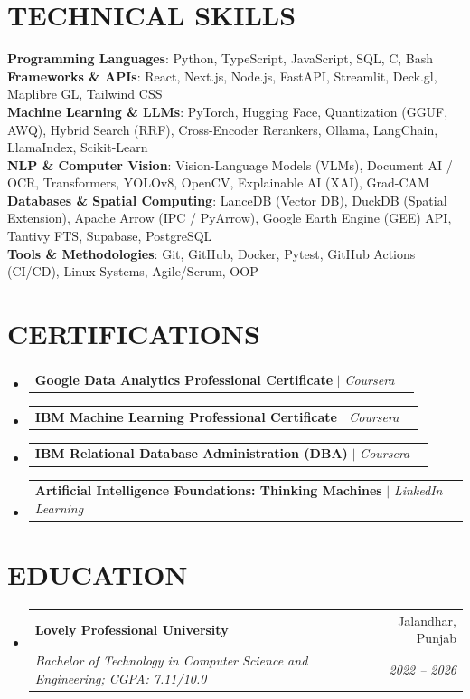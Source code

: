 \documentclass[letterpaper,10pt]{article}
\makeatletter
\newcommand{\resumeSubheading}[4]{
  \vspace{-2pt}\item
    \begin{tabular*}{0.97\textwidth}[t]{l@{\extracolsep{\fill}}r}
      \textbf{#1} & #2 \\
      \textit{\small#3} & \textit{\small #4} \\
    \end{tabular*}\vspace{-7pt}
}
\newcommand{\resumeProjectHeading}[2]{
    \item
    \begin{tabular*}{0.97\textwidth}{l@{\extracolsep{\fill}}r}
      \small#1 & #2 \\
    \end{tabular*}\vspace{-7pt}
}
\newcommand{\resumeSubHeadingListStart}{\begin{itemize}[leftmargin=0.15in, label={}]}
\newcommand{\resumeSubHeadingListEnd}{\end{itemize}}
\makeatother
\begin{document}
\section{TECHNICAL SKILLS}
 \begin{itemize}[leftmargin=0.15in, label={}]
    \small{\item{
      \textbf{Programming Languages}{: Python, TypeScript, JavaScript, SQL, C, Bash} \\
      \textbf{Frameworks \& APIs}{: React, Next.js, Node.js, FastAPI, Streamlit, Deck.gl, Maplibre GL, Tailwind CSS} \\
      \textbf{Machine Learning \& LLMs}{: PyTorch, Hugging Face, Quantization (GGUF, AWQ), Hybrid Search (RRF), Cross-Encoder Rerankers, Ollama, LangChain, LlamaIndex, Scikit-Learn} \\
      \textbf{NLP \& Computer Vision}{: Vision-Language Models (VLMs), Document AI / OCR, Transformers, YOLOv8, OpenCV, Explainable AI (XAI), Grad-CAM} \\
      \textbf{Databases \& Spatial Computing}{: LanceDB (Vector DB), DuckDB (Spatial Extension), Apache Arrow (IPC / PyArrow), Google Earth Engine (GEE) API, Tantivy FTS, Supabase, PostgreSQL} \\
      \textbf{Tools \& Methodologies}{: Git, GitHub, Docker, Pytest, GitHub Actions (CI/CD), Linux Systems, Agile/Scrum, OOP}
    }}
 \end{itemize}

\section{CERTIFICATIONS}
    \resumeSubHeadingListStart
        \resumeProjectHeading
          {\textbf{Google Data Analytics Professional Certificate} $|$ \emph{Coursera}}{}
        \resumeProjectHeading
          {\textbf{IBM Machine Learning Professional Certificate} $|$ \emph{Coursera}}{}
        \resumeProjectHeading
          {\textbf{IBM Relational Database Administration (DBA)} $|$ \emph{Coursera}}{}
        \resumeProjectHeading
          {\textbf{Artificial Intelligence Foundations: Thinking Machines} $|$ \emph{LinkedIn Learning}}{}
    \resumeSubHeadingListEnd

\section{EDUCATION}
  \resumeSubHeadingListStart
    \resumeSubheading
      {Lovely Professional University}{Jalandhar, Punjab}
      {Bachelor of Technology in Computer Science and Engineering; CGPA: 7.11/10.0}{2022 -- 2026}
  \resumeSubHeadingListEnd
\end{document}
